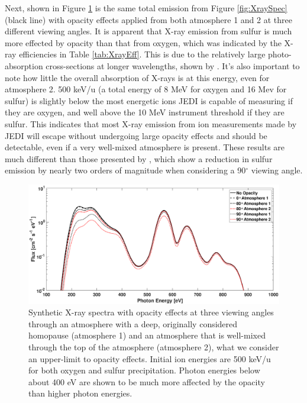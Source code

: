 \documentclass[draft]{agujournal2018}
\begin{document}
Next, shown in Figure \ref{fig:XraySpecOpac} is the same total emission from Figure \ref{fig:XraySpec} (black line) with opacity effects applied from both atmosphere 1 and 2 at three different viewing angles.
It is apparent that X-ray emission from sulfur is much more effected by opacity than that from oxygen, which was indicated by the X-ray efficiencies in Table \ref{tab:XrayEff}.
This is due to the relatively large photo-absorption cross-sections at longer wavelengths, shown by \citet{cravens2006}.
It's also important to note how little the overall absorption of X-rays is at this energy, even for atmosphere 2.
500 keV/u (a total energy of 8 MeV for oxygen and 16 Mev for sulfur) is slightly below the most energetic ions JEDI is capable of measuring if they are oxygen, and well above the 10 MeV instrument threshold \citep{mauk2017ssr} if they are sulfur.
This indicates that most X-ray emission from ion measurements made by JEDI will escape without undergoing large opacity effects and should be detectable, even if a very well-mixed atmosphere is present.
These results are much different than those presented by \citet{ozak2010}, which show a reduction in sulfur emission by nearly two orders of magnitude when considering a 90$^{\circ}$ viewing angle.

\begin{figure}[ht]
    \centering
    \includegraphics[width=\textwidth]{Figures/OpacityATM1ATM2.eps}
    \caption{Synthetic X-ray spectra with opacity effects at three viewing angles through an atmosphere with a deep, originally considered homopause (atmosphere 1) and an atmosphere that is well-mixed through the top of the atmosphere (atmosphere 2), what we consider an upper-limit to opacity effects. Initial ion energies are 500 keV/u for both oxygen and sulfur precipitation. Photon energies below about 400 eV are shown to be much more affected by the opacity than higher photon energies.}
    \label{fig:XraySpecOpac}
\end{figure}
\end{document}
